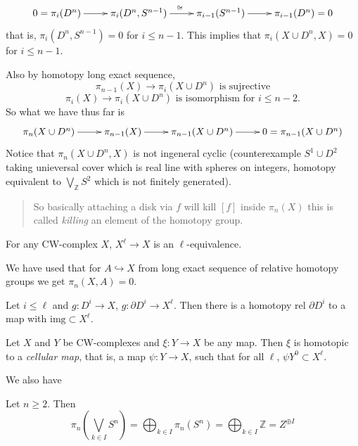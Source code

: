 $$
\xymatrix{
	0=\pi_i(D^n)\ar[r]
	&\pi_i(D^n,S^{n-1})\ar[r]^{\cong}
	&\pi_{i-1}(S^{n-1})\ar[r]
	&\pi_{i-1}(D^n)=0
}
$$
that is, $\pi_i(D^n,S^{n-1})=0$ for $i\leq
n-1$. This implies that $\pi_i(X\cup
D^n,X)=0$ for $i\leq n-1$.

Also by homotopy long exact sequence,
$$\pi_{n-1}(X)\to \pi_i(X\cup D^n)\text{ is
sujrective}$$
$$\pi_i(X)\to \pi_{i}(X\cup D^n)\text{ is
isomorphism for }i\leq n-2.$$
So what we have thus far is
$$
\xymatrix{
	\pi_n(X\cup D^n)\ar[r]
	&\pi_{n-1}(X)\ar[r]
	&\pi_{n-1}(X\cup D^n)\ar[r]
	&0=\pi_{n-1}(X\cup D^n)
}
$$
Notice that $\pi_n(X\cup D^n,X)$ is not
ingeneral cyclic (counterexample $S^1\cup
D^2$ taking unieversal cover which is real
line with spheres on integers, homotopy
equivalent to $\bigvee_\mathbb{Z} S^2$ which
is not finitely generated).

\begin{quote}
	So basically attaching a disk via $f$ will
	kill $[f]$ inside $\pi_n(X)$ this is called
	{\it killing} an element of the homotopy
	group.
\end{quote}

\begin{proposition}
\label{proposition-any-cw-compl-x-x-x-equi}
	For any CW-complex $X$, $X^\ell\to X$ is an
	$\ell$-equivalence.
\end{proposition}

\begin{remark}
\label{remark-we-have-used-x-long-exact}
	We have used that for $A\hookrightarrow X$
	from long exact sequence of relative
	homotopy groups we get $\pi_n(X,A)=0$.
\end{remark}

\begin{lemma}
\label{lemma-let-i-g-d-i-x-g-d-i-x-then}
	Let $i\leq \ell$ and $g: D^i\to X$,
	$g:\partial D^i\to X^\ell$. Then there is a
	homotopy $\text{rel }\partial D^i$ to a map
	with $\text{img}\subset X^\ell$.
\end{lemma}

\begin{theorem}
\label{theorem-cellu-appro-theor}
	Let $X$ and $Y$ be CW-complexes and
	$\xi:Y\to X$ be any map. Then $\xi$ is
	homotopic to a {\it cellular map}, that is,
	a map $\psi:Y\to X$, such that for all
	$\ell$, $\psi Y^0\subset X^\ell$.
\end{theorem}

We also have
\begin{proposition}
\label{proposition-let-n-2-then}
Let $n\geq 2$. Then
$$
\pi_n\left(
\bigvee_{k\in I}S^n\right)
=\bigoplus_{k\in I}\pi_n(S^n)
=\bigoplus_{k\in I}\mathbb{Z}=Z^{\oplus I}
$$
\end{proposition}

